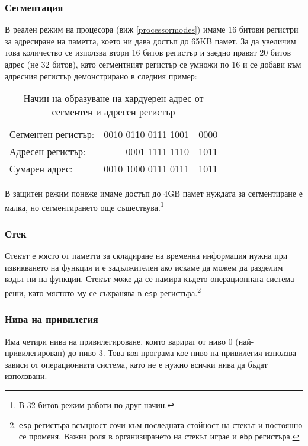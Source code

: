 \subsubsection{Сегментация} \label{segmentation}
В реален режим на процесора (виж \ref{processormodes}) имаме 16 битови регистри за адресиране на паметта, което ни дава достъп до 65KB памет. За да увеличим това количество се използва втори 16 битов регистър и заедно правят 20 битов адрес (не 32 битов), като сегментният регистър се умножи по 16 и се добави към адресния регистър демонстрирано в следния пример: \par
\begin{table}[ht]
  \centering
  \begin{tabular}{l r@{\hskip 3pt}l}
    Сегментен регистър: & 0010 0110 0111 1001 & \color{red}0000 \\
    Адресен регистър: & 0001 1111 1110 & 1011 \\
    \hline
    Сумарен адрес: & 0010 1000 0111 0111 & 1011 \\
  \end{tabular}
  \caption{Начин на образуване на хардуерен адрес от сегментен и адресен регистър}
  \label{segmentationexample}
\end{table}
В защитен режим понеже имаме достъп до 4GB памет нуждата за сегментиране е малка, но сегментирането още съществува.\footnote{В 32 битов режим работи по друг начин.}


\subsubsection{Стек}
Стекът е място от паметта за складиране на временна информация нужна при извикването на функция и е задължителен ако искаме да можем да разделим кодът ни на функции. Стекът може да се намира където операционната система реши, като мястото му се съхранява в {\tt esp} регистъра.\footnote{{\tt esp} регистъра всъщност сочи към последната стойност на стекът и постоянно се променя. Важна роля в организирането на стекът играе и {\tt ebp} регистъра.}

\subsubsection{Нива на привилегия}
Има четири нива на привилегироване, които варират от ниво 0 (най-привилеги\-ро\-ван) до ниво 3. Това коя програма кое ниво на привилегия използва зависи от операционната система, като не е нужно всички нива да бъдат използвани.

